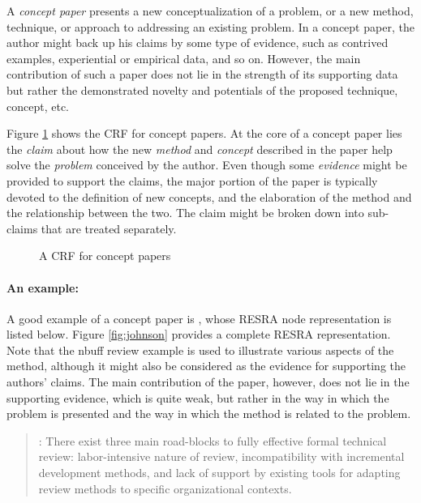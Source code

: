 \begin{itemize}
{A {\it concept paper\/} presents a new conceptualization of a problem, or a
new method, technique, or approach to addressing an existing problem.  In a
concept paper, the author might back up his claims by some type of
evidence, such as contrived examples, experiential or empirical data, and
so on. However, the main contribution of such a paper does not lie in the
strength of its supporting data but rather the demonstrated novelty and
potentials of the proposed technique, concept, etc.

Figure \ref{fig:concept-crf} shows the CRF for concept papers. At the core
of a concept paper lies the {\it claim\/} about how the new {\it method\/}
and {\it concept\/} described in the paper help solve the {\it problem\/}
conceived by the author. Even though some {\it evidence\/} might be
provided to support the claims, the major portion of the paper is typically
devoted to the definition of new concepts, and the elaboration of the
method and the relationship between the two. The claim might be broken down
into sub-claims that are treated separately.

\begin{figure}[htb]
  \caption{A CRF for concept papers}
  \label{fig:concept-crf}
\end{figure}


\paragraph{An example:}

A good example of a concept paper is \cite{csdl-92-07}, whose RESRA node
representation is listed below. Figure \ref{fig:johnson} provides a
complete RESRA representation.  Note that the nbuff review example is used
to illustrate various aspects of the method, although it might also be
considered as the evidence for supporting the authors' claims.  The main
contribution of the paper, however, does not lie in the supporting
evidence, which is quite weak, but rather in the way in which the problem
is presented and the way in which the method is related to the problem.

\small
\begin{quotation}
  : There exist three main road-blocks to fully
  effective formal technical review: labor-intensive nature of review,
  incompatibility with incremental development methods, and lack of
  support by existing tools for adapting review methods to specific
  organizational contexts.
  

\end{quotation}}
\end{itemize}
